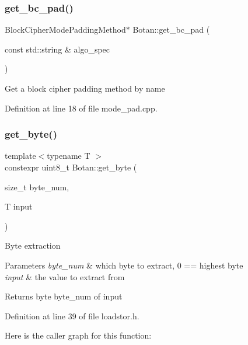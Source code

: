 \subsubsection{\texorpdfstring{get\+\_\+bc\+\_\+pad()}{get\_bc\_pad()}}
{\footnotesize\ttfamily Block\+Cipher\+Mode\+Padding\+Method$\ast$ Botan\+::get\+\_\+bc\+\_\+pad (\begin{DoxyParamCaption}\item[{const std\+::string \&}]{algo\+\_\+spec }\end{DoxyParamCaption})}

Get a block cipher padding method by name 

Definition at line 18 of file mode\+\_\+pad.\+cpp.

\mbox{\label{namespace_botan_ad10dc938a651323dddbfe3c1e985774b}} 
\subsubsection{\texorpdfstring{get\+\_\+byte()}{get\_byte()}}
{\footnotesize\ttfamily template$<$typename T $>$ \\
constexpr uint8\+\_\+t Botan\+::get\+\_\+byte (\begin{DoxyParamCaption}\item[{size\+\_\+t}]{byte\+\_\+num,  }\item[{T}]{input }\end{DoxyParamCaption})\hspace{0.3cm}{\ttfamily [inline]}}

Byte extraction 
\begin{DoxyParams}{Parameters}
{\em byte\+\_\+num} & which byte to extract, 0 == highest byte \\
\hline
{\em input} & the value to extract from \\
\hline
\end{DoxyParams}
\begin{DoxyReturn}{Returns}
byte byte\+\_\+num of input 
\end{DoxyReturn}


Definition at line 39 of file loadstor.\+h.

Here is the caller graph for this function\+:
\mbox{\label{namespace_botan_a9074784e382345388cdeb6db3e69c823}} 
